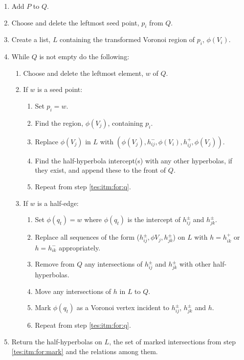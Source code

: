 \begin{enumerate}
  \item Add $P$ to $Q$.
  \item Choose and delete the leftmost seed point, $p_i$ from $Q$.
  \item Create a list, $L$ containing the transformed Voronoi region of $p_i$, $\phi(V_i)$.
  \item\label{tes:itm:for:q} While $Q$ is not empty do the following:
  \begin{enumerate}
    \item Choose and delete the leftmost element, $w$ of $Q$.
    \item If $w$ is a seed point:
    \begin{enumerate}
      \item Set $p_i=w$.
      \item Find the region, $\phi(V_j)$, containing $p_i$.
      \item Replace $\phi(V_j)$ in $L$ with $(\phi(V_j),h^-_{ij},\phi(V_i),h^+_{ij},\phi(V_j))$.
      \item Find the half-hyperbola intercept(s) with any other hyperbolas, if they exist, and append these to the front of $Q$.
      \item Repeat from step \ref{tes:itm:for:q}.
    \end{enumerate}
    \item If $w$ is a half-edge:
    \begin{enumerate}
      \item Set $\phi(q_t)=w$ where $\phi(q_t)$ is the intercept of $h^\pm_{ij}$ and $h^\pm_{jk}$.
      \item Replace all sequences of the form ($h^\pm_{ij},\phi{V_j},h^\pm_{jk}$) on $L$ with $h=h^+_{ik}$ or $h=h^-_{ik}$ appropriately.
      \item Remove from $Q$ any intersections of $h^\pm_{ij}$ and $h^\pm_{jk}$ with other half-hyperbolas.
      \item Move any intersections of $h$ in $L$ to $Q$.
      \item\label{tes:itm:for:mark} Mark $\phi(q_t)$ as a Voronoi vertex incident to $h^\pm_{ij}$, $h^\pm_{jk}$ and $h$.
      \item Repeat from step \ref{tes:itm:for:q}.
    \end{enumerate}
  \end{enumerate}
  \item Return the half-hyperbolas on $L$, the set of marked intersections from step \ref{tes:itm:for:mark} and the relations among them.
\end{enumerate}
